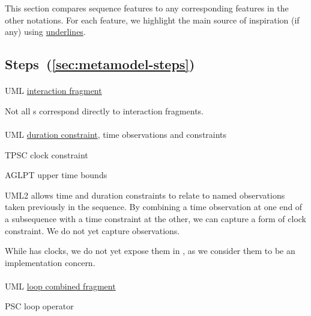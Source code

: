 \newcommand{\insp}[1]{\ul{#1}}

This section compares \langname{} sequence features to any
corresponding features in the other notations.
For each feature, we highlight the main source of inspiration (if any)
using \insp{underlines}.


\subsection{Steps~(\ref{sec:metamodel-steps})}

\paragraph{\msequencestep}
\begin{featset}
\item[UML] \insp{interaction fragment}
\end{featset}

Not all \msequencestep s correspond directly to interaction fragments.

\paragraph{\mdeadlinestep}
\begin{featset}
\item[UML] \insp{duration constraint}, time observations and constraints
\item[TPSC] clock constraint
\item[AGLPT] upper time bounds
\end{featset}

UML2 allows time and duration constraints to relate to named observations taken
previously in the sequence.  By combining a time observation at one end of a
subsequence with a time constraint at the other, we can capture a form of clock
constraint.  We do not yet capture observations.

While \robochart{} has clocks, we do not yet expose them in
\langname, as we consider them to be an implementation concern.
      
\paragraph{\mloopstep}
\begin{featset}
\item[UML] \insp{loop combined fragment}
\item[PSC] loop operator
\end{featset}

